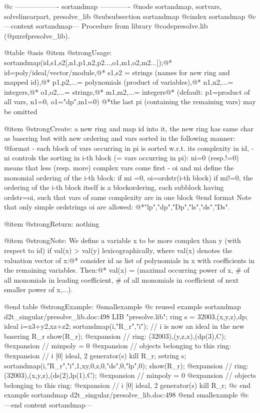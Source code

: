 @c ------------------- sortandmap -------------
@node sortandmap, sortvars, solvelinearpart, presolve_lib
@subsubsection sortandmap
@cindex sortandmap
@c ---content sortandmap---
Procedure from library @code{presolve.lib} (@pxref{presolve_lib}).

@table @asis
@item @strong{Usage:}
sortandmap(id,s1,s2[,n1,p1,n2,p2...,o1,m1,o2,m2...]);@*
id=poly/ideal/vector/module,@*
s1,s2 = strings (names for new ring and mapped id),@*
p1,p2,...= polynomials (product of variables),@*
n1,n2,...= integers,@*
o1,o2,...= strings,@*
m1,m2,...= integers@*
(default: p1=product of all vars, n1=0, o1="dp",m1=0)
@*the last pi (containing the remaining vars) may be omitted

@item @strong{Create:}
a new ring and map id into it, the new ring has same char as basering
but with new ordering and vars sorted in the following manner:
  @format
  - each block of vars occurring in pi is sorted w.r.t. its complexity in id,
  - ni controls the sorting in i-th block (= vars occurring in pi):
    ni=0 (resp.!=0) means that less (resp. more) complex vars come first
  - oi and mi define the monomial ordering of the i-th block:
    if mi =0, oi=ordstr(i-th block)
    if mi!=0, the ordering of the i-th block itself is a blockordering,
      each subblock having ordstr=oi, such that vars of same complexity are
      in one block
  @end format
Note that only simple ordstrings oi are allowed:
@*"lp","dp","Dp","ls","ds","Ds".

@item @strong{Return:}
nothing

@item @strong{Note:}
We define a variable x to be more complex than y (with respect to id)
if val(x) > val(y) lexicographically, where val(x) denotes the
valuation vector of x:@*
consider id as list of polynomials in x with coefficients in the
remaining variables. Then:@*
val(x) = (maximal occurring power of x, # of all monomials in leading
coefficient, # of all monomials in coefficient of next smaller power
of x,...).

@end table
@strong{Example:}
@smallexample
@c reused example sortandmap d2t_singular/presolve_lib.doc:498 
LIB "presolve.lib";
ring s = 32003,(x,y,z),dp;
ideal i=x3+y2,xz+z2;
sortandmap(i,"R_r","i");
// i is now an ideal in the new basering R_r
show(R_r);
@expansion{} // ring: (32003),(y,z,x),(dp(3),C);
@expansion{} // minpoly = 0
@expansion{} // objects belonging to this ring:
@expansion{} // i                    [0]  ideal, 2 generator(s)
kill R_r; setring s;
sortandmap(i,"R_r","i",1,xy,0,z,0,"ds",0,"lp",0);
show(R_r);
@expansion{} // ring: (32003),(x,y,z),(ds(2),lp(1),C);
@expansion{} // minpoly = 0
@expansion{} // objects belonging to this ring:
@expansion{} // i                    [0]  ideal, 2 generator(s)
kill R_r;
@c end example sortandmap d2t_singular/presolve_lib.doc:498
@end smallexample
@c ---end content sortandmap---

